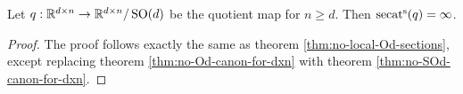 \begin{theorem}\label{thm:no-local-SOd-sections}
    Let $q : \mathbb{R}^{d \times n} \to \mathbb{R}^{d \times n}/\operatorname{SO}(d)$ be the quotient map for $n \geq d$.
    Then $\operatorname{secat^s}(q) = \infty$.
    \begin{proof}
        The proof follows exactly the same as theorem \ref{thm:no-local-Od-sections}, except replacing theorem \ref{thm:no-Od-canon-for-dxn} with theorem \ref{thm:no-SOd-canon-for-dxn}.
    \end{proof}
\end{theorem}


